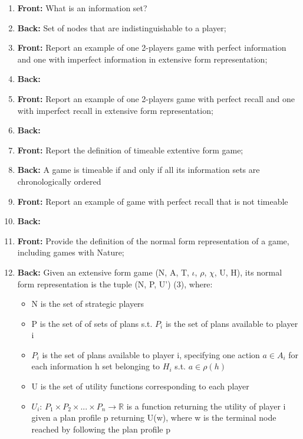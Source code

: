 \documentclass{article}
\begin{document}
\begin{enumerate}
    \item \textbf{Front:} What is an information set?\newpage
    \item \textbf{Back:} Set of nodes that are indistinguishable to a player;\newpage
    \item \textbf{Front:} Report an example of one 2-players game with perfect information and one with imperfect information in extensive form representation;
    \item \textbf{Back:} \newpage
    \item \textbf{Front:} Report an example of one 2-players game with perfect recall and one with imperfect recall in extensive form representation;
    \item \textbf{Back:} \newpage
    \item \textbf{Front:} Report the definition of timeable extentive form game;
    \item \textbf{Back:} A game is timeable if and only if all its information sets are chronologically ordered\newpage
    \item \textbf{Front:} Report an example of game with perfect recall that is not timeable
    \item \textbf{Back:} \newpage
    \item \textbf{Front:} Provide the definition of the normal form representation of a game, including games with Nature;\newpage
    \item \textbf{Back:} Given an extensive form game (N, A, T, $\iota$, $\rho$, $\chi$, U, H), its normal form representation is the tuple (N, P, U') (3), where:\newline
    \begin{itemize}
        \item N is the set of strategic players
        \item P is the set of of sets of plans s.t. $P_i$ is the set of plans available to player i
        \item $P_i$ is the set of plans available to player i, specifying one action $a \in A_i$ for each information h set belonging to $H_i$ s.t. $a \in \rho(h)$
        \item U is the set of utility functions corresponding to each player
        \item $U_i$: $P_1 \times P_2 \times ... \times P_n \rightarrow \mathbb{R}$ is a function returning the utility of player i given a plan profile p returning U(w), where w is the terminal node reached by following the plan profile p

\end{itemize}
\end{enumerate}
\end{document}

